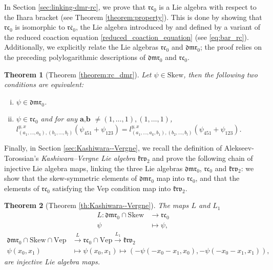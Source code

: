\documentclass[a4paper,fleqn]{cas-sc}
\newtheorem{theorem}{Theorem}
\newcommand{\rc}{\mathfrak{rc}}
\newcommand{\krv}{\mathfrak{krv}}
\begin{document}
In Section \ref{sec:linking-dmr-rc}, we prove that $\mathfrak{rc}_0$ is a Lie algebra with respect to the Ihara bracket (see Theorem \ref{theorem:property}). This is done by showing that $\rc_0$ is isomorphic to $\overline{\mathfrak{rc}_0}$, the Lie algebra introduced by \cite{Ren2025} and defined by a variant of the reduced coaction equation \eqref{reduced_coaction_equation} (see \eqref{eq:bar_rc}).
Additionally, we explicitly relate the Lie algebras $\mathfrak{rc}_0$ and $\mathfrak{dmr}_0$; the proof relies on the preceding polylogarithmic descriptions of $\mathfrak{dmr}_0$ and $\mathfrak{rc}_0$. 

\renewcommand{\thetheorem}{\Alph{theorem}}
\setcounter{theorem}{2}
\begin{theorem}[Theorem \ref{theorem:rc_dmr}] \label{theorem:rc_dmr-A}
	Let $\psi\in \mathrm{Skew}$, then the following two conditions are equivalent:
	\begin{enumerate}[(i)]
		\item %
        $\psi\in \mathfrak{dmr}_0$.
		\item %
        $\psi\in \mathfrak{rc}_0$ and for any $\textbf{a,b}$ $\ne (1,\dots,1),(1,\dots,1)$,
			$l^{y,x}_{(a_1,\dots,a_k),(b_1,\dots,b_l)}(\psi_{451}+\psi_{123})=l^{y,x}_{(a_1,\dots,a_k,b_1),(b_2,\dots,b_l)}(\psi_{451}+\psi_{123})$.
	\end{enumerate}
\end{theorem}


Finally, in Section \ref{sec:Kashiwara--Vergne}, we recall the definition of Alekseev-Torossian's \textit{Kashiwara--Vergne Lie algebra} $\krv_2$ and prove the following chain of injective Lie algebra maps, linking the three Lie algebras $\mathfrak{dmr}_0$, $\mathfrak{rc}_0$ and $\mathfrak{krv}_2$: we show that the skew-symmetric elements of $\mathfrak{dmr}_0$ map into $\mathfrak{rc}_0$, and that the elements of $\mathfrak{rc}_0$ satisfying the Vep condition map into $\mathfrak{krv}_2$. 

\renewcommand{\thetheorem}{\Alph{theorem}}
\setcounter{theorem}{3}
\begin{theorem}[Theorem \ref{th:Kashiwara--Vergne}] \label{th:Kashiwara--Vergne-E}
The maps $L$ and $L_1$
\begin{align*}
        L: \mathfrak{dmr}_0 \cap \mathrm{Skew} & \to \mathfrak{rc}_0 \\
        \psi & \mapsto \psi,
    \end{align*}
\begin{align*}
\mathfrak{dmr}_0\cap \mathrm{Skew}\cap\mathrm{Vep}&\xrightarrow{L} \mathfrak{rc}_0\cap \mathrm{Vep}\xrightarrow{L_1} \mathfrak{krv}_2&\\
\psi(x_0,x_1)&\mapsto \psi(x_0,x_1)\mapsto (-\psi(-x_0-x_1, x_0), -\psi(-x_0-x_1, x_1)),
\end{align*}
are injective Lie algebra maps.
\end{theorem}
\end{document}
